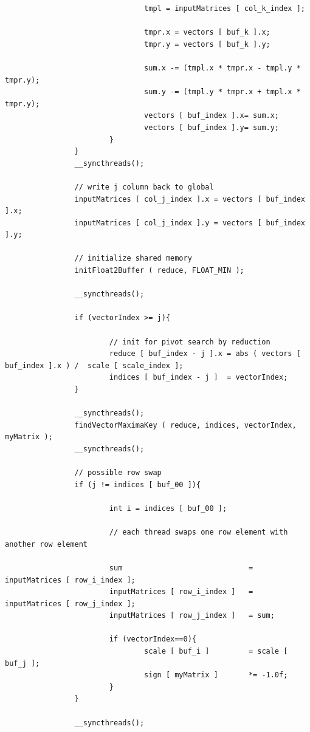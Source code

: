 \documentclass[letter, 12pt]{article}
\begin{document}
\begin{verbatim}
                                tmpl = inputMatrices [ col_k_index ];

                                tmpr.x = vectors [ buf_k ].x;
                                tmpr.y = vectors [ buf_k ].y;

                                sum.x -= (tmpl.x * tmpr.x - tmpl.y * tmpr.y);
                                sum.y -= (tmpl.y * tmpr.x + tmpl.x * tmpr.y);
                                vectors [ buf_index ].x= sum.x;
                                vectors [ buf_index ].y= sum.y;
                        }
                }
                __syncthreads();

                // write j column back to global
                inputMatrices [ col_j_index ].x = vectors [ buf_index ].x;
                inputMatrices [ col_j_index ].y = vectors [ buf_index ].y;

                // initialize shared memory
                initFloat2Buffer ( reduce, FLOAT_MIN );

                __syncthreads();

                if (vectorIndex >= j){

                        // init for pivot search by reduction
                        reduce [ buf_index - j ].x = abs ( vectors [ buf_index ].x ) /  scale [ scale_index ];
                        indices [ buf_index - j ]  = vectorIndex;
                }

                __syncthreads();
                findVectorMaximaKey ( reduce, indices, vectorIndex, myMatrix );
                __syncthreads();

                // possible row swap
                if (j != indices [ buf_00 ]){

                        int i = indices [ buf_00 ];

                        // each thread swaps one row element with another row element

                        sum                             = inputMatrices [ row_i_index ];
                        inputMatrices [ row_i_index ]   = inputMatrices [ row_j_index ];
                        inputMatrices [ row_j_index ]   = sum;

                        if (vectorIndex==0){
                                scale [ buf_i ]         = scale [ buf_j ];
                                sign [ myMatrix ]       *= -1.0f;
                        }
                }

                __syncthreads();


\end{verbatim}
\end{document}
